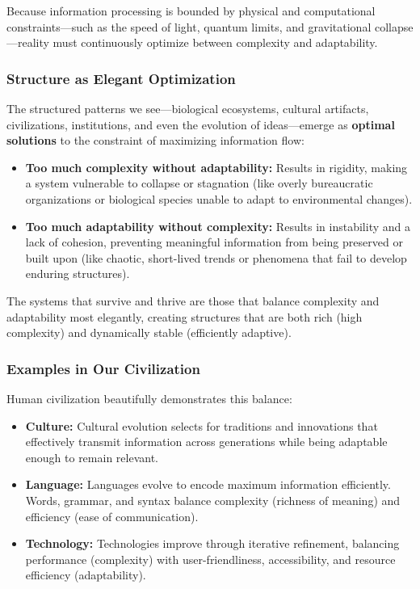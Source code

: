 \documentclass[12pt]{article}
\begin{document}
Because information processing is bounded by physical and computational constraints—such as the speed of light, quantum limits, and gravitational collapse—reality must continuously optimize between complexity and adaptability.

\subsubsection{Structure as Elegant Optimization}

The structured patterns we see—biological ecosystems, cultural artifacts, civilizations, institutions, and even the evolution of ideas—emerge as \textbf{optimal solutions} to the constraint of maximizing information flow:

\begin{itemize}
    \item \textbf{Too much complexity without adaptability:}  
    Results in rigidity, making a system vulnerable to collapse or stagnation (like overly bureaucratic organizations or biological species unable to adapt to environmental changes).
    \item \textbf{Too much adaptability without complexity:}  
    Results in instability and a lack of cohesion, preventing meaningful information from being preserved or built upon (like chaotic, short-lived trends or phenomena that fail to develop enduring structures).
\end{itemize}

The systems that survive and thrive are those that balance complexity and adaptability most elegantly, creating structures that are both rich (high complexity) and dynamically stable (efficiently adaptive).

\subsubsection{Examples in Our Civilization}
Human civilization beautifully demonstrates this balance:

\begin{itemize}
    \item \textbf{Culture:}  
    Cultural evolution selects for traditions and innovations that effectively transmit information across generations while being adaptable enough to remain relevant.
    \item \textbf{Language:}  
    Languages evolve to encode maximum information efficiently. Words, grammar, and syntax balance complexity (richness of meaning) and efficiency (ease of communication).
    \item \textbf{Technology:}  
    Technologies improve through iterative refinement, balancing performance (complexity) with user-friendliness, accessibility, and resource efficiency (adaptability).
\end{itemize}
\end{document}
